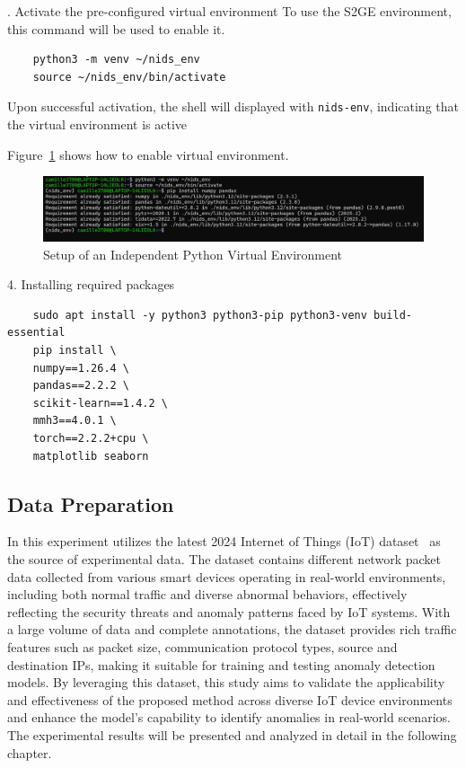 \begin{ZhChapter}
    . Activate the pre-configured virtual environment
    To use the S2GE environment, this command will be used to enable it.
    \begin{verbatim}
    python3 -m venv ~/nids_env
    source ~/nids_env/bin/activate
    \end{verbatim}




    Upon successful activation, the shell will displayed with \texttt{nids-env}, indicating that the virtual environment is active



    Figure~\ref{fig:Nids} shows how to enable virtual environment.

    \begin{figure}[htbp]
        \centering
        \includegraphics[width = 1\textwidth]{image/Nids-env.jpg}
        \caption{Setup of an Independent Python Virtual Environment}
        \label{fig:Nids}
    \end{figure}




    4. Installing required packages
    \begin{verbatim}
    sudo apt install -y python3 python3-pip python3-venv build-essential
    pip install \
    numpy==1.26.4 \
    pandas==2.2.2 \
    scikit-learn==1.4.2 \
    mmh3==4.0.1 \
    torch==2.2.2+cpu \
    matplotlib seaborn

    \end{verbatim}






    \subsection{Data Preparation}
    In this experiment utilizes the latest 2024 Internet of Things (IoT) dataset~\cite{ciciot2024} as the source of experimental data. The dataset contains different network packet data collected from various smart devices operating in real-world environments, including both normal traffic and diverse abnormal behaviors, effectively reflecting the security threats and anomaly patterns faced by IoT systems. With a large volume of data and complete annotations, the dataset provides rich traffic features such as packet size, communication protocol types, source and destination IPs, making it suitable for training and testing anomaly detection models. By leveraging this dataset, this study aims to validate the applicability and effectiveness of the proposed method across diverse IoT device environments and enhance the model's capability to identify anomalies in real-world scenarios. The experimental results will be presented and analyzed in detail in the following chapter.



\end{ZhChapter}
